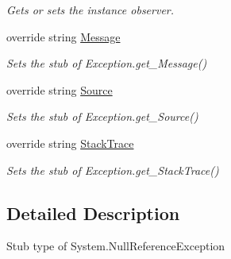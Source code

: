 \begin{DoxyCompactItemize}
\begin{DoxyCompactList}\small\item\em Gets or sets the instance observer.\end{DoxyCompactList}\item 
override string \hyperlink{class_system_1_1_fakes_1_1_stub_null_reference_exception_a99ca1cd25dbc8fe1de488a24beadb4b1}{Message}
\begin{DoxyCompactList}\small\item\em Sets the stub of Exception.\-get\-\_\-\-Message()\end{DoxyCompactList}\item 
override string \hyperlink{class_system_1_1_fakes_1_1_stub_null_reference_exception_a11c37624b140b9a0481a7723bbd7ced8}{Source}
\begin{DoxyCompactList}\small\item\em Sets the stub of Exception.\-get\-\_\-\-Source()\end{DoxyCompactList}\item 
override string \hyperlink{class_system_1_1_fakes_1_1_stub_null_reference_exception_aef438efba4d7142d41759bf843f9e3d2}{Stack\-Trace}
\begin{DoxyCompactList}\small\item\em Sets the stub of Exception.\-get\-\_\-\-Stack\-Trace()\end{DoxyCompactList}\end{DoxyCompactItemize}


\subsection{Detailed Description}
Stub type of System.\-Null\-Reference\-Exception



